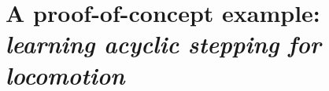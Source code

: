 \section{A proof-of-concept example: \textnormal{\textit{learning acyclic stepping for locomotion}}}